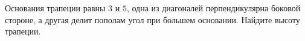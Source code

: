 \begin{ex}
	\begin{condition}
		Основания трапеции равны \( 3 \) и \( 5 \), одна из диагоналей перпендикулярна боковой стороне, а другая делит пополам угол	при большем основании. Найдите высоту трапеции.
	\end{condition}
\end{ex}